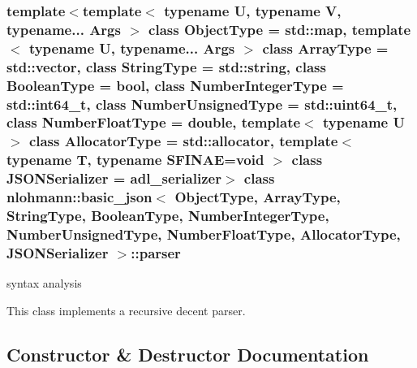 \subsubsection*{template$<$template$<$ typename U, typename V, typename... Args $>$ class Object\+Type = std\+::map, template$<$ typename U, typename... Args $>$ class Array\+Type = std\+::vector, class String\+Type = std\+::string, class Boolean\+Type = bool, class Number\+Integer\+Type = std\+::int64\+\_\+t, class Number\+Unsigned\+Type = std\+::uint64\+\_\+t, class Number\+Float\+Type = double, template$<$ typename U $>$ class Allocator\+Type = std\+::allocator, template$<$ typename T, typename S\+F\+I\+N\+A\+E=void $>$ class J\+S\+O\+N\+Serializer = adl\+\_\+serializer$>$\newline
class nlohmann\+::basic\+\_\+json$<$ Object\+Type, Array\+Type, String\+Type, Boolean\+Type, Number\+Integer\+Type, Number\+Unsigned\+Type, Number\+Float\+Type, Allocator\+Type, J\+S\+O\+N\+Serializer $>$\+::parser}

syntax analysis 

This class implements a recursive decent parser. 

\subsection{Constructor \& Destructor Documentation}
\mbox{\label{classnlohmann_1_1basic__json_1_1parser_aac563319f4df894ab542a2b6d19209ae}} 
